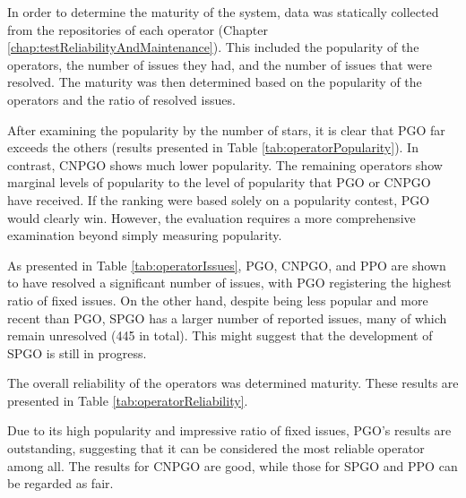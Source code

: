 
In order to determine the maturity of the system, data was statically collected from the repositories of each operator (Chapter \ref{chap:testReliabilityAndMaintenance}).
This included the popularity of the operators, the number of issues they had, and the number of issues that were resolved.
The maturity was then determined based on the popularity of the operators and the ratio of resolved issues.

After examining the popularity by the number of stars, it is clear that PGO far exceeds the others (results presented in Table \ref{tab:operatorPopularity}). In contrast, CNPGO shows much lower popularity.
The remaining operators show marginal levels of popularity to the level of popularity that PGO or CNPGO have received.
If the ranking were based solely on a popularity contest, PGO would clearly win. However, the evaluation requires a more comprehensive examination beyond simply measuring popularity.

As presented in Table \ref{tab:operatorIssues}, PGO, CNPGO, and PPO are shown to have resolved a significant number of issues, with PGO registering the highest ratio of fixed issues. On the other hand, despite being less popular and more recent than PGO, SPGO has a larger number of reported issues, many of which remain unresolved (445 in total). This might suggest that the development of SPGO is still in progress.

The overall reliability of the operators was determined maturity. These results are presented in Table \ref{tab:operatorReliability}.

Due to its high popularity and impressive ratio of fixed issues, PGO's results are outstanding, suggesting that it can be considered the most reliable operator among all.
The results for CNPGO are good, while those for SPGO and PPO can be regarded as fair.

